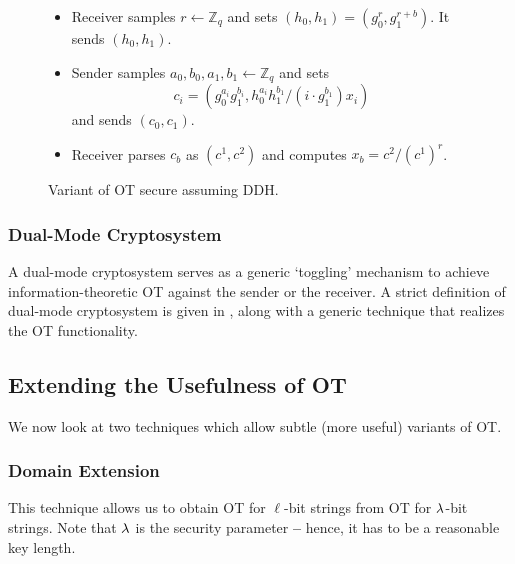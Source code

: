 \begin{figure}[h]
	\begin{mdframed}[
		linecolor=black,
		linewidth=1pt,
		roundcorner=5pt,
		backgroundcolor=white,
		userdefinedwidth=\textwidth,
		]
		\vspace{2mm}
		\begin{itemize}
			\item Receiver samples $r\gets\mathbb{Z}_q$ and sets $(h_0, h_1)=(g_0^r, g_1^{r+b})$. It sends $(h_0, h_1)$.
			\item Sender samples $a_0, b_0, a_1, b_1\gets\mathbb{Z}_q$ and sets $$c_i = (g_0^{a_i}g_1^{b_i}, h_0^{a_i}h_1^{b_1}/(i\cdot g_1^{b_1})x_i)$$ and sends $(c_0, c_1)$.
			\item Receiver parses $c_b$ as $(c^1, c^2)$ and computes $x_b = c^2/(c^1)^r$.
		\end{itemize}
		\vspace{2mm}
	\end{mdframed}
	\caption{Variant of OT secure assuming DDH.}
	\label{fig:DDHOT}
\end{figure}

\subsubsection{Dual-Mode Cryptosystem} A dual-mode cryptosystem serves as a generic `toggling' mechanism to achieve information-theoretic OT against the sender or the receiver. A strict definition of dual-mode cryptosystem is given in \cite{dualmode}, along with a generic technique that realizes the OT functionality.

\subsection{Extending the Usefulness of OT}

We now look at two techniques which allow subtle (more useful) variants of OT.

\subsubsection{Domain Extension} This technique allows us to obtain OT for $\ell$-bit strings from OT for $\lambda$-bit strings. Note that $\lambda$ is the security parameter \textbf{--} hence, it has to be a reasonable key length.

